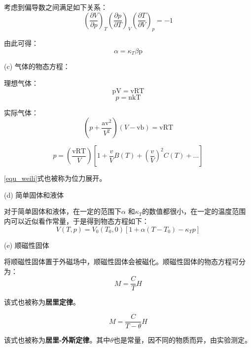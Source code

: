 \documentclass[UTF8]{ctexart}
\begin{document}
	考虑到偏导数之间满足如下关系：
	\begin{equation}
	\left(\frac{\partial V}{\partial p}\right)_{T}\left(\frac{\partial p}{\partial T}\right)_{V}\left(\frac{\partial T}{\partial V}\right)_{p}=-1
	\end{equation}
	
	由此可得：
	\begin{equation}
	\alpha=\kappa_{T} \beta \mathrm{p}
	\end{equation}
	
	(c) 气体的物态方程：
	
	理想气体：
	\begin{equation}
	\mathrm{pV}=\mathrm{vRT}
	\end{equation}
	\begin{equation}
	p=\mathrm{nkT}
	\end{equation}
	
	实际气体：
	\begin{equation}
	\left(p+\frac{\mathrm{av}^{2}}{V^{2}}\right)(V-\mathrm{vb})=\mathrm{vRT}
	\end{equation}
	
	\begin{equation}
	p=\left(\frac{\mathrm{vRT}}{V}\right)\left[1+\frac{v}{V} B(T)+\left(\frac{v}{V}\right)^{2} C(T)+\ldots\right]
	\label{equ_weili}
	\end{equation}
	
\noindent \ref{equ_weili}式也被称为位力展开。
	
	
	(d) 简单固体和液体
	
	对于简单固体和液体，在一定的范围下$ \alpha $ 和$ \kappa_{T} $的数值都很小，在一定的温度范围内可以近似看作常量，于是得到物态方程如下：
	\begin{equation}
	V(T, p)=V_{0}\left(T_{0}, 0\right)\left[1+\alpha\left(T-T_{0}\right)-\kappa_{T} p\right]
	\end{equation}
	
	(e) 顺磁性固体
	
	将顺磁性固体置于外磁场中，顺磁性固体会被磁化。顺磁性固体的物态方程可分为：
	\begin{equation}
	M=\frac{C}{T} H
	\end{equation}

\noindent 该式也被称为\textbf{居里定律}。

	\begin{equation}
		M= \frac{C}{T-\theta} H
	\end{equation}
	
\noindent 该式也被称为\textbf{居里-外斯定律}。其中$ \theta $也是常量，因不同的物质而异，由实验测定。
\end{document}
